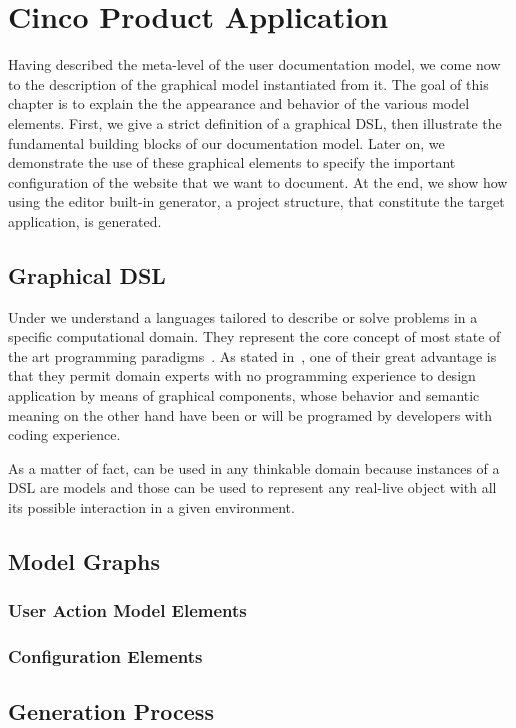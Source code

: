 \chapter{Cinco Product Application}\label{ch:CP}
Having described the meta-level of the user documentation model, we come now to the description of the graphical model instantiated from it. The goal of this chapter is to explain the the appearance and behavior of the various model elements. First, we give a strict definition of a graphical DSL, then illustrate the fundamental building blocks of our documentation model. Later on, we demonstrate the use of these graphical elements to specify the important configuration of the website that we want to document. At the end, we show how using the editor built-in generator, a project structure, that constitute the target application, is generated.

\section{Graphical DSL}\label{sec:gDSL}

Under  we understand a languages tailored to describe or solve problems in a specific computational domain. They represent the core concept of most state of the art programming paradigms~\cite{perez-et_al}. As stated in~\cite{Naujokat2018}, one of their great advantage is that they permit domain experts with no programming experience to design application by means of graphical components, whose behavior and semantic meaning on the other hand have been or will be programed by developers with coding experience.

As a matter of fact,  can be used in any thinkable domain because instances of a DSL are models and those can be used to represent any real-live object with all its possible interaction in a given environment.

\section{Model Graphs}\label{sec:ModElem}


\subsection{User Action Model Elements}\label{sec:FuncElem}


\subsection{Configuration Elements}\label{sec:ConfElem}


\section{Generation Process}

